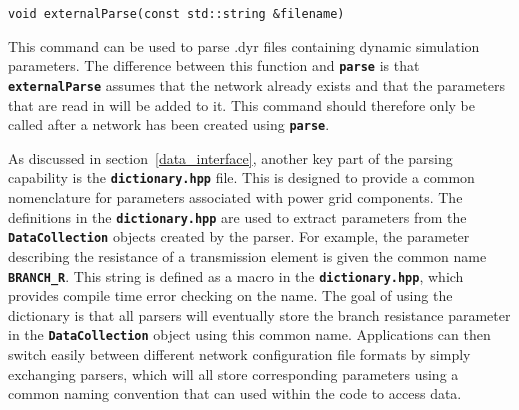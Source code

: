 {
\color{red}
\begin{Verbatim}[fontseries=b]
void externalParse(const std::string &filename)
\end{Verbatim}
}

This command can be used to parse .dyr files containing dynamic simulation parameters. The difference between this function and \texttt{\textbf{parse}} is that \texttt{\textbf{externalParse}} assumes that the network already exists and that the parameters that are read in will be added to it. This command should therefore only be called after a network has been created using \texttt{\textbf{parse}}.

As discussed in section~\ref{data_interface}, another key part of the parsing
capability is the \texttt{\textbf{dictionary.hpp}} file. This is designed to provide a common nomenclature for parameters associated with power grid components.
The definitions in the \texttt{\textbf{dictionary.hpp}} are used to extract
parameters from the \texttt{\textbf{DataCollection}} objects created by the
parser. For example, the parameter describing the resistance of a transmission
element is given the common name \texttt{\textbf{BRANCH\_R}}. This string is
defined as a macro in the \texttt{\textbf{dictionary.hpp}}, which
provides compile time error checking on the name. The goal of using the dictionary is that all parsers will eventually store the branch resistance parameter in the \texttt{\textbf{DataCollection}} object using this common name. Applications can then switch easily between different network configuration file formats by simply exchanging parsers, which will all store corresponding parameters using a common naming convention that can used within the code to access data.

